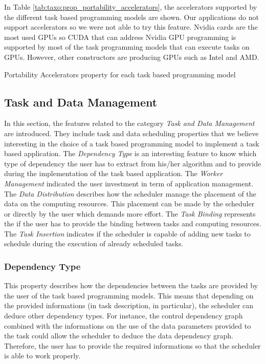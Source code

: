 In Table \ref{tab:taxo:prop_portability_accelerators}, the accelerators supported by the different task based programming models are shown.
Our applications do not support accelerators so we were not able to try this feature.
Nvidia cards are the most used GPUs so CUDA that can address Nvidia GPU programming is supported by most of the task programming models that can execute tasks on GPUs.
However, other constructors are producing GPUs such as Intel and AMD.

\begin{table}[H]
	\caption{Portability Accelerators property for each task based programming model \label{tab:taxo:prop_portability_accelerators}}
	\centering
	\begin{multicols}{2}
		

		
	\end{multicols}
\end{table}

\subsection{Task and Data Management}
In this section, the features related to the category \textit{Task and Data Management} are introduced.
They include task and data scheduling properties that we believe interesting in the choice of a task based programming model to implement a task based application.
The \textit{Dependency Type} is an interesting feature to know which  type of dependency the user has to extract from his/her algorithm and to provide during the implementation of the task based application.
The \textit{Worker Management} indicated the user investment in term of application management.
The \textit{Data Distribution} describes how the scheduler manage the placement of the data on the computing resources.
This placement can be made by the scheduler or directly by the user which demands more effort.
The \textit{Task Binding} represents the if the user has to provide the binding between tasks and computing resources.
The \textit{Task Insertion} indicates if the scheduler is capable of adding new tasks to schedule during the execution of already scheduled tasks.

\subsubsection{Dependency Type}
This property describes how the dependencies between the tasks are provided by the user of the task based programming models.
This means that depending on the provided informations (in task description, in particular), the scheduler can deduce other dependency types.
For instance, the control dependency graph combined with the informations on the use of the data parameters provided to the task could allow the scheduler to deduce the data dependency graph.
Therefore, the user has to provide the required informations so that the scheduler is able to work properly.

